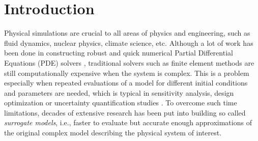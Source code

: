 \section{Introduction}
Physical simulations are crucial to all areas of physics and engineering, such as fluid dynamics, nuclear physics, climate science, etc. Although a lot of work has been done in constructing robust and quick numerical Partial Differential Equations (PDE) solvers \cite{numerical_matemathics}, traditional solvers such as finite element methods are still computationally expensive when the system is complex. This is a problem especially when repeated evaluations of a model for different initial conditions and parameters are needed, which is typical in sensitivity analysis, design optimization or uncertainty quantification studies \cite{UQ,Perk2014}. To overcome such time limitations, decades of extensive research has been put into building so called \textit{surrogate models}, i.e., faster to evaluate but accurate enough approximations of the original complex model describing the physical system of interest. 



